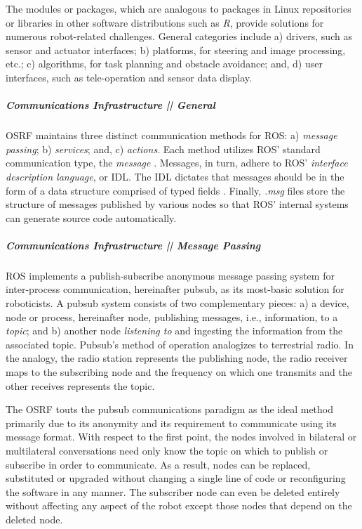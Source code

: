 \documentclass[9pt,twocolumn,twoside]{../../styles/osajnl}
\begin{document}
The modules or packages, which are analogous to packages in Linux repositories or libraries in other software distributions such as \textit{R}, provide solutions for numerous robot-related challenges.  General categories include a) drivers, such as sensor and actuator interfaces; b) platforms, for steering and image processing, etc.; c) algorithms, for task planning and obstacle avoidance; and, d) user interfaces, such as tele-operation and sensor data display. \cite{www-software-categories}

\subparagraph{Communications Infrastructure || General}
OSRF maintains three distinct communication methods for ROS: a) \textit{message passing}; b) \textit{services}; and, c) \textit{actions}.  Each method utilizes ROS' standard communication type, the \textit{message} \cite{www-ros-core-components}.  Messages, in turn, adhere to ROS' \textit{interface description language}, or IDL. The IDL dictates that messages should be in the form of a data structure comprised of typed fields \cite{www-ros-messages}. Finally, \textit{.msg} files store the structure of messages published by various nodes so that ROS' internal systems can generate source code automatically.

\subparagraph{Communications Infrastructure || Message Passing}
ROS implements a publish-subscribe anonymous message passing system for inter-process communication, hereinafter pubsub, as its most-basic solution for roboticists.  A pubsub system consists of two complementary pieces: a) a device, node or process, hereinafter node, publishing messages, i.e., information, to a \textit{topic}; and b) another node \textit{listening to} and ingesting the information from the associated topic.  Pubsub's method of operation analogizes to terrestrial radio.  In the analogy, the radio station represents the publishing node, the radio receiver maps to the subscribing node and the frequency on which one transmits and the other receives represents the topic.  

The OSRF touts the pubsub communications paradigm as the ideal method  primarily due to its anonymity and its requirement to communicate using its message format.  With respect to the first point, the nodes involved in bilateral or multilateral conversations need only know the topic on which to publish or subscribe in order to communicate.  As a result, nodes can be replaced, substituted or upgraded without changing a single line of code or reconfiguring the software in any manner.  The subscriber node can even be deleted entirely without affecting any aspect of the robot except those nodes that depend on the deleted node.
\end{document}
